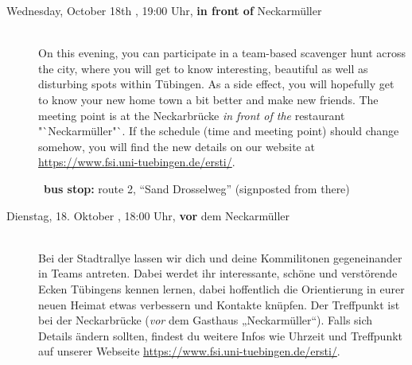 \begin{description}



\ifml
	\item[Wednesday, October 18th \YEAR, 19:00 Uhr, \textbf{in front of} Neckarmüller ]\ \\
	On this evening, you can participate in a team-based scavenger hunt across the city, where you will get to know interesting, beautiful as well as disturbing spots within Tübingen. As a side effect, you will hopefully get to know your new home town a bit better and make new friends. The meeting point is at the Neckarbrücke \emph{in front of the} restaurant "`Neckarmüller"`.
	If the schedule (time and meeting point) should change somehow, you will find the new details on our website at \url{https://www.fsi.uni-tuebingen.de/ersti/}.

	~\textbf{bus stop:} route 2, "`Sand Drosselweg"' (signposted from there)
\else
	 \item[Dienstag, 18. Oktober \YEAR, 18:00 Uhr, \textbf{vor} dem Neckarmüller ]\ \\
	 Bei der Stadtrallye lassen wir dich und deine Kommilitonen gegeneinander in Teams antreten. Dabei werdet ihr interessante, schöne und verstörende Ecken Tübingens kennen lernen, dabei hoffentlich die Orientierung in eurer neuen Heimat etwas verbessern und Kontakte knüpfen. Der Treffpunkt ist bei der Neckarbrücke (\emph{vor} dem Gasthaus „Neckarmüller“).
	 Falls sich Details ändern sollten, findest du weitere Infos wie Uhrzeit und Treffpunkt auf unserer Webseite \url{https://www.fsi.uni-tuebingen.de/ersti/}.
\fi


\end{description}
